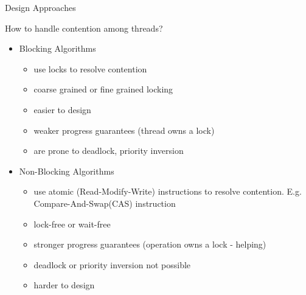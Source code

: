 \begin{frame}{Design Approaches}
\begin{center}
\Large How to handle contention among threads?
\end{center}
\pause
\begin{itemize}
\item<2-> \Large Blocking Algorithms
\begin{itemize}
\item<3-> use locks to resolve contention
\item<3-> coarse grained or fine grained locking
\item<3->  {\color{black!50!green} easier to design}
\item<3->  {\color{red}weaker progress guarantees} (thread owns a lock) 
\item<3->  {\color{red}are prone to deadlock, priority inversion}
\end{itemize}
\phantom{hello world}
\item<2-> \Large Non-Blocking Algorithms
\begin{itemize}
\item<4->  use atomic (Read-Modify-Write) instructions to resolve contention. E.g. Compare-And-Swap(CAS) instruction
\item<4-> lock-free or wait-free
\item<4-> {\color{black!50!green}stronger progress guarantees} (operation owns a lock - helping)
\item<4-> {\color{black!50!green}deadlock or priority inversion not possible}
\item<4-> {\color{red}harder to design}
\end{itemize}
\end{itemize}
\end{frame}